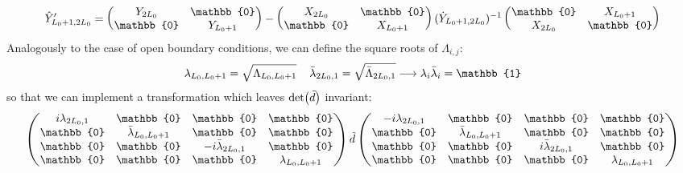\begin{equation}
    \Hat{Y}'_{L_0 + 1, 2L_0} = \begin{pmatrix}
        Y_{2L_0} & \mathbb{0} \\
        \mathbb{0} & Y_{L_0 + 1}
    \end{pmatrix} - \begin{pmatrix}
        X_{2L_0} & \mathbb{0} \\
        \mathbb{0} & X_{L_0 + 1} \\
    \end{pmatrix} (\Dot{Y}_{L_0 + 1, 2L_0})^{-1} \begin{pmatrix}
        \mathbb{0} & X_{L_0 + 1} \\
        X_{2L_0} & \mathbb{0}
    \end{pmatrix}
\end{equation}
Analogously to the case of open boundary conditions, we can define the square roots of $\Lambda_{i,j}$:
\begin{equation}
    \lambda_{L_0, L_0 + 1} = \sqrt{\Lambda_{L_0, L_0 + 1}} \hspace{4mm} \Bar{\lambda}_{2L_0, 1} = \sqrt{\Bar{\Lambda}_{2L_0, 1}} \longrightarrow \lambda_i \Bar{\lambda}_i = \mathbb{1}
\end{equation}
so that we can implement a transformation which leaves $\det(\Tilde{d})$ invariant:
\begin{equation}
        \begin{pmatrix}
        i\lambda_{2L_0, 1} & \mathbb{0} & \mathbb{0} & \mathbb{0} \\
        \mathbb{0} & \Bar{\lambda}_{L_0, L_0 + 1} & \mathbb{0} & \mathbb{0} \\
        \mathbb{0} & \mathbb{0} & -i\Bar{\lambda}_{2L_0, 1} & \mathbb{0} \\
        \mathbb{0} & \mathbb{0} & \mathbb{0} & \lambda_{L_0, L_0 + 1} \\
    \end{pmatrix} \Tilde{d} \begin{pmatrix}
        -i\lambda_{2L_0, 1} & \mathbb{0} & \mathbb{0} & \mathbb{0} \\
        \mathbb{0} & \bar{\lambda}_{L_0, L_0 + 1} & \mathbb{0} & \mathbb{0} \\
        \mathbb{0} & \mathbb{0} & i\Bar{\lambda}_{2L_0, 1} & \mathbb{0} \\
        \mathbb{0} & \mathbb{0} & \mathbb{0} & \lambda_{L_0, L_0 + 1} \\
    \end{pmatrix}
\end{equation}
